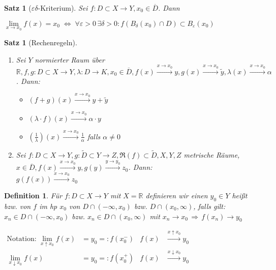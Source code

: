 \documentclass[ngerman,a4paper]{report}
\theoremstyle{break}
\newtheorem{satz}[theorem]{Satz}
\newtheorem*{definition}{Definition}
\renewcommand{\epsilon}{\varepsilon}
\begin{document}
\begin{satz}[$\epsilon\delta$-Kriterium]
	Sei $f:D\subset X\to Y, x_0\in\overline{D}$. Dann
	\begin{center}
	$\lim\limits_{x\rightarrow x_0} f(x) = x_0 \;\Leftrightarrow \; \forall\epsilon > 0\,\exists \delta > 0: f(B_\delta(x_0)\cap D)\subset B_\epsilon(x_0)$
	\end{center}
\end{satz}

\begin{satz}[Rechenregeln] \label{satz:rechenregel_stetigkeit}
	\begin{enumerate}[label={\arabic*)}]
		\item Sei $Y$ normierter Raum über $\mathbb{R}, f,g:D\subset X\to Y,\lambda: D\to K, x_0\in\overline{D}, f(x)\overset{x\to x_0}{\longrightarrow} y, g(x) \overset{x\to x_0}{\longrightarrow} \tilde{y}, \lambda(x)\overset{x\to x_0}{\longrightarrow} \alpha$. Dann:
		\begin{itemize}
			\item $(f+g)(x) \overset{x\to x_0}{\longrightarrow} y+\tilde{y}$
			\item $(\lambda \cdot f)(x) \overset{x\to x_0}{\longrightarrow} \alpha\cdot y$
			\item $\left(\frac{1}{\lambda}\right)(x) \overset{x\to x_0}{\longrightarrow} \frac{1}{\alpha}$ falls $\alpha\neq 0$
		\end{itemize}
		\item Sei $f: D\subset X\to Y, g:\tilde{D}\subset Y\to Z, \Re(f)\subset\tilde{D}, X,Y,Z$ metrische Räume, $x\in\overline{D}, f(x)\overset{x\to x_0}{\longrightarrow}y, g(y)\overset{y\to y_0}{\longrightarrow} z_0$. Dann:\\
		$g(f(x)) \overset{x\to x_0}{\longrightarrow} z_0$
	\end{enumerate}
\end{satz}

\begin{definition}
	Für $f:D\subset X\to Y$ mit $X=\mathbb{R}$ definieren wir einen  $y_0\in Y$ heißt  bzw.  von $f$ im \gls{hp} $x_0$ von $D\cap(-\infty, x_0)$ bzw. $D\cap(x_0,\infty)$, falls gilt: $x_n\in D\cap(-\infty, x_0)$ bzw. $x_n\in D\cap (x_0,\infty)$ mit $x_n\to x_0\,\Rightarrow \,f(x_n)\to y_0$
	
	$\begin{aligned}
		\text{Notation: } \lim\limits_{x\uparrow x_0} f(x) &= y_0 =: f(x_0^-)& f(x)&\overset{x\uparrow x_0}{\longrightarrow} y_0 \\
		\lim\limits_{x\downarrow x_0}f(x) &= y_0 =:f(x_0^+) & f(x) &\overset{x\downarrow x_0}{\longrightarrow} y_0
	\end{aligned}$
\end{definition}
\end{document}
